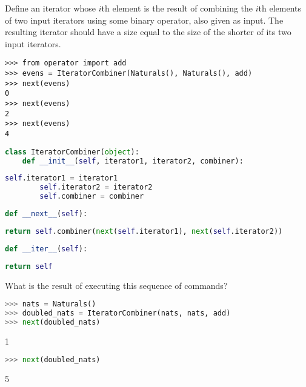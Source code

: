 \question Define an iterator whose $i$th element is the result of combining the
$i$th elements of two input iterators using some binary operator, also given as
input. The resulting iterator should have a size equal to the size of the
shorter of its two input iterators.

\begin{minipage}{\textwidth}
\begin{lstlisting}
>>> from operator import add
>>> evens = IteratorCombiner(Naturals(), Naturals(), add)
>>> next(evens)
0
>>> next(evens)
2
>>> next(evens)
4
\end{lstlisting}
\end{minipage}
\begin{lstlisting}[language=Python]
class IteratorCombiner(object):
    def __init__(self, iterator1, iterator2, combiner):
\end{lstlisting}

\begin{solution}[1in]
\begin{lstlisting}[language=Python]
        self.iterator1 = iterator1
        self.iterator2 = iterator2
        self.combiner = combiner
\end{lstlisting}
\end{solution}
\begin{lstlisting}[language=Python]
    def __next__(self):
\end{lstlisting}
\begin{solution}[.75in]
\begin{lstlisting}[language=Python]
        return self.combiner(next(self.iterator1), next(self.iterator2))
\end{lstlisting}
\end{solution}
\begin{lstlisting}[language=Python]
    def __iter__(self):
\end{lstlisting}
\begin{solution}[.5in]
\begin{lstlisting}[language=Python]
        return self
\end{lstlisting}
\end{solution}

\question What is the result of executing this sequence of commands?
\begin{lstlisting}[language=Python]
>>> nats = Naturals()
>>> doubled_nats = IteratorCombiner(nats, nats, add)
>>> next(doubled_nats)
\end{lstlisting}

\begin{solution}[.25in]
1
\end{solution}
\begin{lstlisting}[language=Python]
>>> next(doubled_nats)
\end{lstlisting}
\begin{solution}[.25in]
5
\end{solution}
